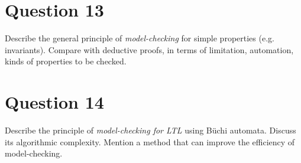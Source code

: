 \documentclass{article}
\begin{document}
  \section{Question 13}
  Describe the general principle of \textit{model-checking} for simple
  properties (e.g. invariants). Compare with deductive proofs, in terms of
  limitation, automation, kinds of properties to be checked. \newline
  \section{Question 14}
  Describe the principle of \textit{model-checking for LTL} using Büchi
  automata. Discuss its algorithmic complexity. Mention a method that can
  improve the efficiency of model-checking. \newline
\end{document}
